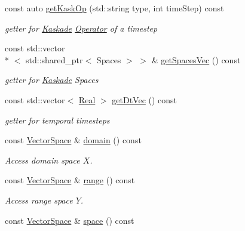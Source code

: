 \begin{DoxyCompactItemize}
\item 
const auto \hyperlink{classSpacy_1_1KaskadeParabolic_1_1OCP_1_1LinearBlockOperator_a804775104742e28b72d6269b6d0130a5}{get\-Kask\-Op} (std\-::string type, int time\-Step) const 
\begin{DoxyCompactList}\small\item\em getter for \hyperlink{namespaceSpacy_1_1Kaskade}{Kaskade} \hyperlink{classSpacy_1_1Operator}{Operator} of a timestep \end{DoxyCompactList}\item 
const std\-::vector\\*
$<$ std\-::shared\-\_\-ptr$<$ Spaces $>$ $>$ \& \hyperlink{classSpacy_1_1KaskadeParabolic_1_1OCP_1_1LinearBlockOperator_a3e1d35571ced863966224c280aa3868f}{get\-Spaces\-Vec} () const 
\begin{DoxyCompactList}\small\item\em getter for \hyperlink{namespaceSpacy_1_1Kaskade}{Kaskade} Spaces \end{DoxyCompactList}\item 
const std\-::vector$<$ \hyperlink{classSpacy_1_1Real}{Real} $>$ \hyperlink{classSpacy_1_1KaskadeParabolic_1_1OCP_1_1LinearBlockOperator_a48d919fc54b7a65edaa74641ca040d19}{get\-Dt\-Vec} () const 
\begin{DoxyCompactList}\small\item\em getter for temporal timesteps \end{DoxyCompactList}\item 
\hypertarget{classSpacy_1_1OperatorBase_a2588f9b3e0188820c4c494e63293dc6f}{const \hyperlink{classSpacy_1_1VectorSpace}{Vector\-Space} \& \hyperlink{classSpacy_1_1OperatorBase_a2588f9b3e0188820c4c494e63293dc6f}{domain} () const }\label{classSpacy_1_1OperatorBase_a2588f9b3e0188820c4c494e63293dc6f}

\begin{DoxyCompactList}\small\item\em Access domain space $X$. \end{DoxyCompactList}\item 
\hypertarget{classSpacy_1_1OperatorBase_ab19d3b7a6f290b1079248f1e567e53d6}{const \hyperlink{classSpacy_1_1VectorSpace}{Vector\-Space} \& \hyperlink{classSpacy_1_1OperatorBase_ab19d3b7a6f290b1079248f1e567e53d6}{range} () const }\label{classSpacy_1_1OperatorBase_ab19d3b7a6f290b1079248f1e567e53d6}

\begin{DoxyCompactList}\small\item\em Access range space $Y$. \end{DoxyCompactList}\item 
\hypertarget{classSpacy_1_1VectorBase_aa999dbf9d679d895dfe04c10fbf9f5e9}{const \hyperlink{classSpacy_1_1VectorSpace}{Vector\-Space} \& \hyperlink{classSpacy_1_1VectorBase_aa999dbf9d679d895dfe04c10fbf9f5e9}{space} () const }\label{classSpacy_1_1VectorBase_aa999dbf9d679d895dfe04c10fbf9f5e9}


\end{DoxyCompactItemize}
